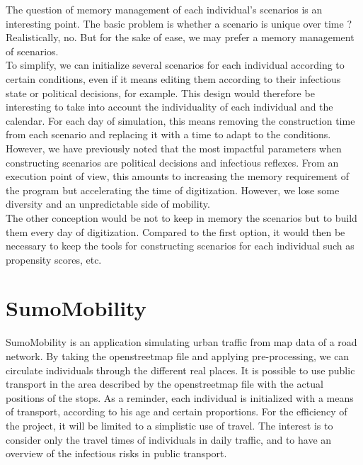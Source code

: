 The question of memory management of each individual's scenarios is an interesting point. The basic problem is whether a scenario is unique over time ? Realistically, no. But for the sake of ease, we may prefer a memory management of scenarios.\\

To simplify, we can initialize several scenarios for each individual according to certain conditions, even if it means editing them according to their infectious state or political decisions, for example. This design would therefore be interesting to take into account the individuality of each individual and the calendar. For each day of simulation, this means removing the construction time from each scenario and replacing it with a time to adapt to the conditions.\\

However, we have previously noted that the most impactful parameters when constructing scenarios are political decisions and infectious reflexes. From an execution point of view, this amounts to increasing the memory requirement of the program but accelerating the time of digitization. However, we lose some diversity and an unpredictable side of mobility.\\

The other conception would be not to keep in memory the scenarios but to build them every day of digitization. Compared to the first option, it would then be necessary to keep the tools for constructing scenarios for each individual such as propensity scores, etc.\\

\newpage

\section{SumoMobility}

SumoMobility is an application simulating urban traffic from map data of a road network. By taking the openstreetmap file and applying pre-processing, we can circulate individuals through the different real places. It is possible to use public transport in the area described by the openstreetmap file with the actual positions of the stops. As a reminder, each individual is initialized with a means of transport, according to his age and certain proportions. For the efficiency of the project, it will be limited to a simplistic use of travel. The interest is to consider only the travel times of individuals in daily traffic, and to have an overview of the infectious risks in public transport.\\

